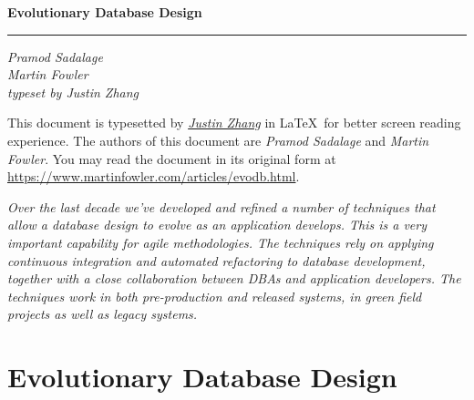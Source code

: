 \documentclass[12pt]{article}
\newcommand{\mytitle}[1]{
  {\HUGE \bfseries #1}\par
}
\newcommand{\mysubtitle}[1]{
  {\emph{#1}}\par
}
\begin{document}
\begin{titlepage}
\begin{minipage}{0.8\linewidth}
  \vspace*{4cm}
  \begin{center}
    \noindent
    \mytitle{Evolutionary Database Design}
    \rule{\linewidth}{0.2ex}\par
    \mysubtitle{Pramod Sadalage \\ Martin Fowler \\ typeset by Justin
    Zhang}
  \end{center}
\end{minipage}
\null \vfill
\hfill
\begin{minipage}{0.55\linewidth}
  \begin{flushright}
  \end{flushright}
\end{minipage}
%
\titlepagedecoration
\end{titlepage}

\newpage
\tableofcontents

\newpage
This document is typesetted by \href{mailto:schnell18@gmail.com}{\emph{Justin
Zhang}} in \LaTeX\ for better screen reading experience. The authors of
this document are \emph{Pramod Sadalage} and \emph{Martin Fowler}. You
may read the document in its original form at
\href{https://www.martinfowler.com/articles/evodb.html}{https://www.martinfowler.com/articles/evodb.html}.

\newpage
\emph{
Over the last decade we've developed and refined a number of techniques
that allow a database design to evolve as an application develops. This
is a very important capability for agile methodologies. The techniques
rely on applying continuous integration and automated refactoring to
database development, together with a close collaboration between DBAs
and application developers. The techniques work in both pre-production
and released systems, in green field projects as well as legacy systems.
}

\newpage
\section{Evolutionary Database Design}
\end{document}
